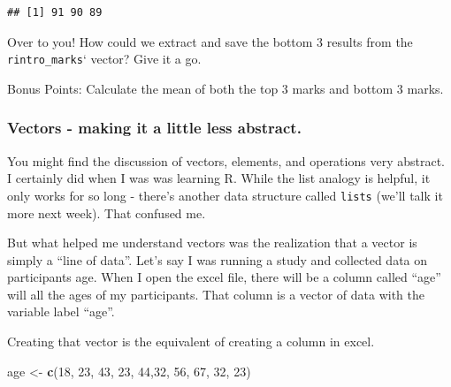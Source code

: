 \documentclass[
]{book}
\newenvironment{Shaded}{\begin{snugshade}}{\end{snugshade}}
\newcommand{\DecValTok}[1]{\textcolor[rgb]{0.00,0.00,0.81}{#1}}
\newcommand{\FunctionTok}[1]{\textcolor[rgb]{0.13,0.29,0.53}{\textbf{#1}}}
\newcommand{\NormalTok}[1]{#1}
\newcommand{\OtherTok}[1]{\textcolor[rgb]{0.56,0.35,0.01}{#1}}
\begin{document}
\begin{verbatim}
## [1] 91 90 89
\end{verbatim}

Over to you! How could we extract and save the bottom 3 results from the \texttt{rintro\_marks}` vector? Give it a go.

Bonus Points: Calculate the mean of both the top 3 marks and bottom 3 marks.

\hypertarget{vectors---making-it-a-little-less-abstract.}{%
\subsubsection{Vectors - making it a little less abstract.}\label{vectors---making-it-a-little-less-abstract.}}

You might find the discussion of vectors, elements, and operations very abstract. I certainly did when I was was learning R. While the list analogy is helpful, it only works for so long - there's another data structure called \texttt{lists} (we'll talk it more next week). That confused me.

But what helped me understand vectors was the realization that a vector is simply a ``line of data''. Let's say I was running a study and collected data on participants age. When I open the excel file, there will be a column called ``age'' will all the ages of my participants. That column is a vector of data with the variable label ``age''.

Creating that vector is the equivalent of creating a column in excel.

\begin{Shaded}
\begin{Highlighting}[]
\NormalTok{age }\OtherTok{\textless{}{-}} \FunctionTok{c}\NormalTok{(}\DecValTok{18}\NormalTok{, }\DecValTok{23}\NormalTok{, }\DecValTok{43}\NormalTok{, }\DecValTok{23}\NormalTok{, }\DecValTok{44}\NormalTok{,}\DecValTok{32}\NormalTok{, }\DecValTok{56}\NormalTok{, }\DecValTok{67}\NormalTok{, }\DecValTok{32}\NormalTok{, }\DecValTok{23}\NormalTok{)}
\end{Highlighting}
\end{Shaded}
\end{document}
